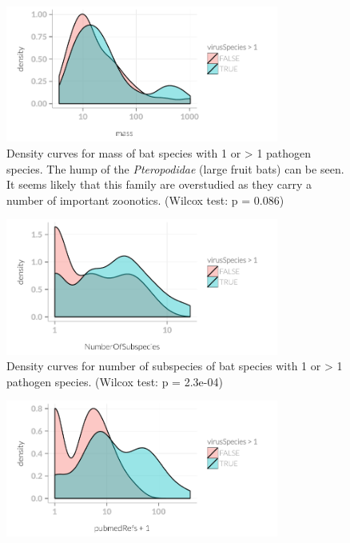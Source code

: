 \begin{knitrout}\footnotesize
{}\color{fgcolor}\begin{figure}[t]

{\centering \includegraphics[width=0.8\textwidth]{figure/rm1vir-1} 

}

\caption[Density of mass variable for 1 or >1 viruses.]{Density curves for mass of bat species with 1 or > 1 pathogen species.
The hump of the \emph{Pteropodidae} (large fruit bats) can be seen.
It seems likely that this family are overstudied as they carry a number of important zoonotics.
(Wilcox test: p = 0.086)}\label{fig:rm1vir}
\end{figure}

\begin{figure}[t]

{\centering \includegraphics[width=0.8\textwidth]{figure/rm1vir-2} 

}

\caption[Density of number of subspecies 1 or >1 viruses.]{Density curves for number of subspecies of bat species with 1 or > 1 pathogen species.
(Wilcox test: p = 2.3e-04)}\label{fig:rm1vir}
\end{figure}

\begin{figure}[t]

{\centering \includegraphics[width=0.8\textwidth]{figure/rm1vir-3} 

}
\end{figure}
\end{knitrout}
